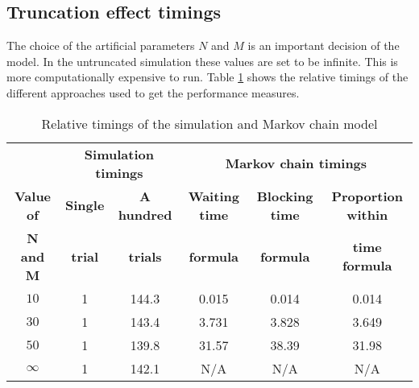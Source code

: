 \subsection{Truncation effect timings} \label{sec:truncation_effect}

The choice of the artificial parameters \(N\) and \(M\) is an important 
decision of the model.
In the untruncated simulation these values are set to be infinite. 
This is more computationally expensive to run.
Table \ref{tab:truncation_effect_timings} shows the relative timings of the
different approaches used to get the performance measures.

\begin{table}[h]
    \centering
    \begin{tabular}{c|cc|ccc}
        & \multicolumn{2}{c}{\textbf{Simulation timings}} & 
        \multicolumn{3}{c}{\textbf{Markov chain timings}} \\
        \textbf{Value of} & \textbf{Single} & \textbf{A hundred} & 
        \textbf{Waiting time} & \textbf{Blocking time} & 
        \textbf{Proportion within} \\
        \textbf{N and M} & \textbf{trial} & \textbf{trials} & 
        \textbf{formula} & \textbf{formula} & \textbf{time formula} \\
        \hline
        \(10\) & 1 & 144.3 & 0.015 & 0.014 & 0.014 \\
        \hline
        \(30\) & 1 & 143.4 & 3.731 & 3.828 & 3.649 \\
        \hline
        \(50\) & 1 & 139.8 & 31.57 & 38.39 & 31.98 \\
        \hline
        \(\infty\) & 1 & 142.1 & N/A & N/A & N/A \\
    \end{tabular}
    \caption{Relative timings of the simulation and Markov chain model}
    \label{tab:truncation_effect_timings}
\end{table}
